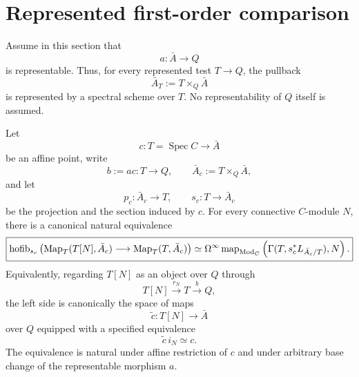 \section{Represented first-order comparison}
\label{sec:var-first-represented}

Assume in this section that
\[
    a:\bar A\longrightarrow Q
\]
is representable. Thus, for every represented test \(T\to Q\), the pullback
\[
    \bar A_T:=T\times_Q\bar A
\]
is represented by a spectral scheme over \(T\). No representability of \(Q\) itself is assumed.

\begin{lemma}
\label{lem:var-affine-relative-lifts}
Let
\[
    c:T=\operatorname{Spec}C\longrightarrow\bar A
\]
be an affine point, write
\[
    b:=ac:T\longrightarrow Q,
    \qquad
    \bar A_c:=T\times_Q\bar A,
\]
and let
\[
    p_c:\bar A_c\longrightarrow T,
    \qquad
    s_c:T\longrightarrow\bar A_c
\]
be the projection and the section induced by \(c\). For every connective \(C\)-module \(N\), there is a canonical natural equivalence
\[
    \boxed{
    \operatorname{hofib}_{s_c}\left(
      \operatorname{Map}_T(T[N],\bar A_c)
      \longrightarrow
      \operatorname{Map}_T(T,\bar A_c)
    \right)
    \simeq
    \Omega^\infty
    \operatorname{map}_{\operatorname{Mod}_C}
    \left(
      \Gamma(T,s_c^*L_{\bar A_c/T}),
      N
    \right).
    }
\]
Equivalently, regarding \(T[N]\) as an object over \(Q\) through
\[
    T[N]\xrightarrow{r_N}T\xrightarrow{b}Q,
\]
the left side is canonically the space of maps
\[
    \widetilde c:T[N]\longrightarrow\bar A
\]
over \(Q\) equipped with a specified equivalence
\[
    \widetilde c\,i_N\simeq c.
\]
The equivalence is natural under affine restriction of \(c\) and under arbitrary base change of the representable morphism \(a\).
\end{lemma}

